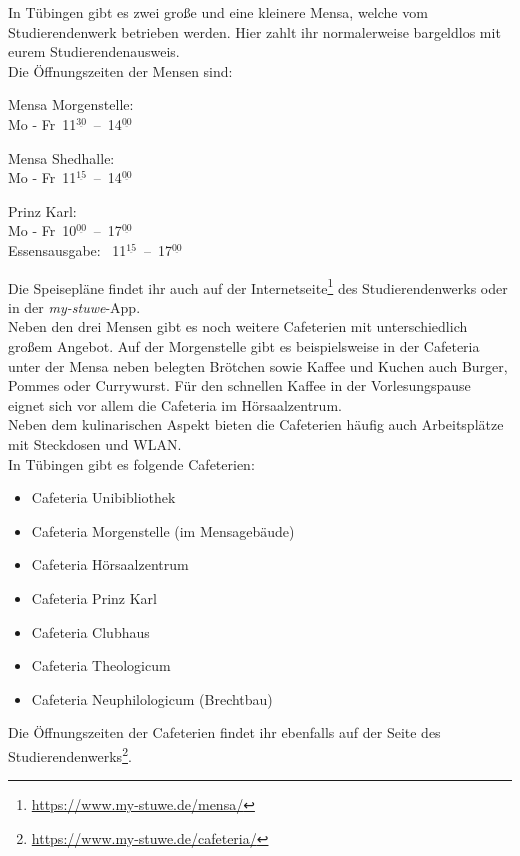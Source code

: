 
In Tübingen gibt es zwei große und eine kleinere Mensa, welche vom Studierendenwerk betrieben werden. Hier zahlt ihr normalerweise bargeldlos mit eurem Studierendenausweis.\\
Die Öffnungszeiten der Mensen sind:
\begin{center}

Mensa Morgenstelle:\\
Mo - Fr~11$^{\underline{30}}$~--~14$^{\underline{00}}$

\bigskip

Mensa Shedhalle:\\
Mo - Fr~11$^{\underline{15}}$~--~14$^{\underline{00}}$

\nopagebreak
Prinz Karl:\\
Mo - Fr~10$^{\underline{00}}$~--~17$^{\underline{00}}$\\
Essensausgabe: ~11$^{\underline{15}}$~--~17$^{\underline{00}}$

\end{center}

Die Speisepläne findet ihr auch auf der Internetseite\footnote{\url{https://www.my-stuwe.de/mensa/}} des Studierendenwerks oder in der \emph{my-stuwe}-App.\\	%

Neben den drei Mensen gibt es noch weitere Cafeterien mit unterschiedlich großem Angebot. Auf der Morgenstelle gibt es beispielsweise in der Cafeteria unter der Mensa neben belegten Brötchen sowie Kaffee und Kuchen auch Burger, Pommes oder Currywurst. Für den schnellen Kaffee in der Vorlesungspause eignet sich vor allem die Cafeteria im Hörsaalzentrum.\\
Neben dem kulinarischen Aspekt bieten die Cafeterien häufig auch Arbeitsplätze mit Steckdosen und WLAN.\\
In Tübingen gibt es folgende Cafeterien:
\begin{itemize}
	\item Cafeteria Unibibliothek
	\item Cafeteria Morgenstelle (im Mensagebäude)
	\item Cafeteria Hörsaalzentrum
	\item Cafeteria Prinz Karl
	\item Cafeteria Clubhaus
	\item Cafeteria Theologicum
	\item Cafeteria Neuphilologicum (Brechtbau)
\end{itemize}
Die Öffnungszeiten der Cafeterien findet ihr ebenfalls auf der Seite des Studierendenwerks\footnote{\url{https://www.my-stuwe.de/cafeteria/}}.	%
